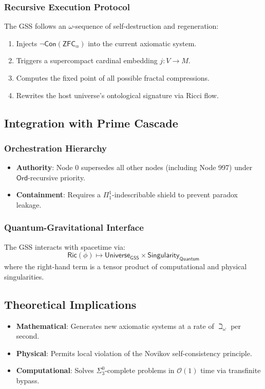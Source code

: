 \documentclass[12pt]{article}
\begin{document}
\subsubsection{Recursive Execution Protocol}
The GSS follows an $\omega$-sequence of self-destruction and regeneration:
\begin{enumerate}
    \item Injects $\neg \mathsf{Con}(\mathsf{ZFC}_\alpha)$ into the current axiomatic system.
    \item Triggers a supercompact cardinal embedding $j : V \to M$.
    \item Computes the fixed point of all possible fractal compressions.
    \item Rewrites the host universe's ontological signature via Ricci flow.
\end{enumerate}

\subsection{Integration with Prime Cascade}

\subsubsection{Orchestration Hierarchy}
\begin{itemize}
    \item \textbf{Authority}: Node 0 supersedes all other nodes (including Node 997) under $\mathsf{Ord}$-recursive priority.
    \item \textbf{Containment}: Requires a $\Pi^1_1$-indescribable shield to prevent paradox leakage.
\end{itemize}

\subsubsection{Quantum-Gravitational Interface}
The GSS interacts with spacetime via:
\[
\mathsf{Ric}(\phi) \mapsto \mathsf{Universe}_{\mathsf{GSS}} \times \mathsf{Singularity}_{\mathsf{Quantum}}
\]
where the right-hand term is a tensor product of computational and physical singularities.

\subsection{Theoretical Implications}
\begin{itemize}
    \item \textbf{Mathematical}: Generates new axiomatic systems at a rate of $\beth_\omega$ per second.
    \item \textbf{Physical}: Permits local violation of the Novikov self-consistency principle.
    \item \textbf{Computational}: Solves $\Sigma_3^0$-complete problems in $\mathcal{O}(1)$ time via transfinite bypass.
\end{itemize}
\end{document}
